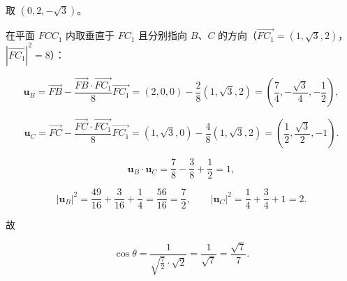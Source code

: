 \begin{answer}
取 $(0,2,-\sqrt3)$。

在平面 $FCC_1$ 内取垂直于 $FC_1$ 且分别指向 $B$、$C$ 的方向（$\overrightarrow{FC_1}=(1,\sqrt3,2)$，$|\overrightarrow{FC_1}|^2=8$）：

\nopagebreak[4]
\[\boldsymbol u_B=\overrightarrow{FB}-\frac{\overrightarrow{FB}\cdot\overrightarrow{FC_1}}{8}\overrightarrow{FC_1}
=(2,0,0)-\frac28(1,\sqrt3,2)=\left(\frac74,-\frac{\sqrt3}{4},-\frac12\right),\]

\nopagebreak[4]
\[\boldsymbol u_C=\overrightarrow{FC}-\frac{\overrightarrow{FC}\cdot\overrightarrow{FC_1}}{8}\overrightarrow{FC_1}
=(1,\sqrt3,0)-\frac48(1,\sqrt3,2)=\left(\frac12,\frac{\sqrt3}{2},-1\right).\]

\nopagebreak[4]
\[\boldsymbol u_B\cdot\boldsymbol u_C=\frac78-\frac38+\frac12=1,\]

\nopagebreak[4]
\[|\boldsymbol u_B|^2=\frac{49}{16}+\frac{3}{16}+\frac14=\frac{56}{16}=\frac72,\qquad |\boldsymbol u_C|^2=\frac14+\frac34+1=2 .\]

故

\nopagebreak[4]
\[\cos\theta=\frac{1}{\sqrt{\frac72}\cdot\sqrt2}=\frac{1}{\sqrt7}=\frac{\sqrt7}{7} .\]


\end{answer}
